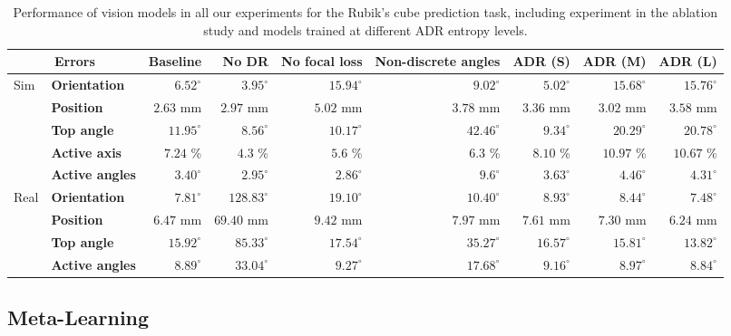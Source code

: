 \begin{table}[h]
    \caption{Performance of vision models in all our experiments for the Rubik's cube prediction task, including experiment in the ablation study and models trained at different ADR entropy levels.}
    \label{table:vision-ablations-full}
    \centering
    \renewcommand{\arraystretch}{1.3}
    \begin{tabular}{ll|r|rrr|rrr}
        \toprule
        \multicolumn{2}{c|}{Errors} & Baseline & No DR & No focal loss & Non-discrete angles & ADR (S) & ADR (M) & ADR (L) \\
        \midrule
        \multirow{5}{*}{Sim} 
        & \textbf{Orientation} & $6.52^\circ$ & $3.95^\circ$ & $15.94^\circ$ & $9.02^\circ$ & $5.02^\circ$ & $15.68^\circ$ & $15.76^\circ$ \\
        &  \textbf{Position} & $2.63$ mm & $2.97$ mm & $5.02$ mm & $3.78$ mm & $3.36$ mm & $3.02$ mm & $3.58$ mm \\
        & \textbf{Top angle} & $11.95^\circ$ & $8.56^\circ$ & $10.17^\circ$ & $42.46^\circ$ & $9.34^\circ$ & $20.29^\circ$ & $20.78^\circ$ \\
        & \textbf{Active axis} & $7.24$ \% & $4.3$ \% & $5.6$ \% & $6.3$ \% & $8.10$ \% & $10.97$ \% & $10.67$ \%\\
        & \textbf{Active angles} & $3.40^\circ$ & $2.95^\circ$ & $2.86^\circ$ & $9.6^\circ$ & $3.63^\circ$ & $4.46^\circ$ & $4.31^\circ$ \\
        \midrule
        \multirow{5}{*}{Real} 
        & \textbf{Orientation} & $7.81^\circ$ & $128.83^\circ$ & $19.10^\circ$ & $10.40^\circ$ & $8.93^\circ$ & $8.44^\circ$ & $\mathbf{7.48}^\circ$ \\
        &  \textbf{Position} & $6.47$ mm & $69.40$ mm & $9.42$ mm & $7.97$ mm & $7.61$ mm & $7.30$ mm & $\mathbf{6.24}$ mm \\
        & \textbf{Top angle} & $15.92^\circ$ & $85.33^\circ$ & $17.54^\circ$ & $35.27^\circ$ & $16.57^\circ$ & $15.81^\circ$ & $\mathbf{13.82}^\circ$ \\
        & \textbf{Active angles} & $8.89^\circ$ & $33.04^\circ$ & $9.27^\circ$ & $17.68^\circ$ & $9.16^\circ$ & $8.97^\circ$ & $\mathbf{8.84}^\circ$ \\
        \bottomrule
    \end{tabular}
\end{table}

\subsection{Meta-Learning}
\label{app:full-results-meta}

